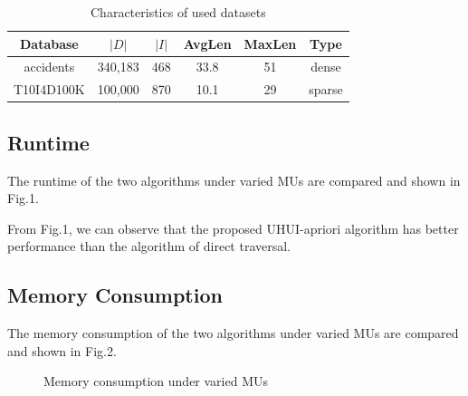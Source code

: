 \documentclass[conference]{IEEEtran}
\begin{document}
\begin{table}
  \centering
  \caption{Characteristics of used datasets}
  \label{tab:CUD}
  \begin{tabular}{|c|c|c|c|c|c|}\hline
  \bfseries {Database} & \bfseries {$|D|$} & \bfseries {$|I|$} & \bfseries {AvgLen} & \bfseries {MaxLen} & \bfseries {Type} \\ \hline
  accidents & 340,183 & 468 & 33.8 & 51 & dense\\ \hline
  T10I4D100K & 100,000 & 870 & 10.1 & 29 & sparse\\ \hline
  \end{tabular}
\end{table}

\vspace{-0.2cm}
\subsection{Runtime}

The runtime of the two algorithms under varied MUs are compared and shown in Fig.1.

From Fig.1, we can observe that the proposed UHUI-apriori algorithm has better performance than the algorithm of direct traversal.

\vspace{-0.2cm}
\subsection{Memory Consumption}

The memory consumption of the two algorithms under varied MUs are compared and shown in Fig.2.

\begin{figure}[htbp]
\vspace{-0.4cm}
  \centering
\vspace{-0.3cm}
  \caption{Memory consumption under varied MUs}
  \label{fig:time}
\vspace{-0.4cm}
\end{figure}
\end{document}
